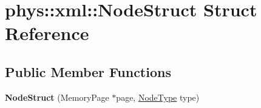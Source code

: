 \hypertarget{structphys_1_1xml_1_1NodeStruct}{
\section{phys::xml::NodeStruct Struct Reference}
\label{d7/dd5/structphys_1_1xml_1_1NodeStruct}
}
\subsection*{Public Member Functions}
\begin{DoxyCompactItemize}
\item 
\hypertarget{structphys_1_1xml_1_1NodeStruct_ab7db6e817c43962b6e67e7faa70a2862}{
{\bfseries NodeStruct} (MemoryPage $\ast$page, \hyperlink{namespacephys_1_1xml_a668b0cc666a9d49f7c7222a7552115d3}{NodeType} type)}
\label{d7/dd5/structphys_1_1xml_1_1NodeStruct_ab7db6e817c43962b6e67e7faa70a2862}

\end{DoxyCompactItemize}
